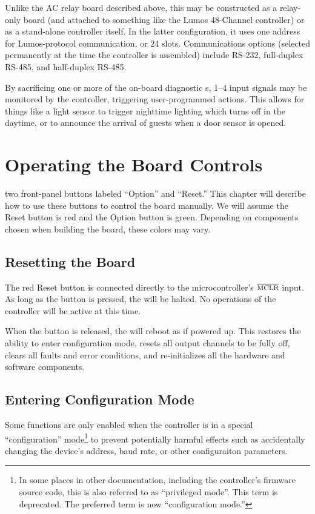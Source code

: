 \documentclass[letterpaper,twoside,onecolumn,openright,final]{memoir}
\begin{document}
Unlike the AC relay board described above, this may be constructed as a relay-only board (and attached
to something like the Lumos 48-Channel controller) or as a stand-alone controller itself.  In the latter
configuration, it uses one address for Lumos-protocol communication, or 24  slots.
Communications options (selected permanently at the time the controller is assembled) include
RS-232, full-duplex RS-485, and half-duplex RS-485.

By sacrificing one or more of the on-board diagnostic s, 1--4 input signals may be 
monitored by the controller, triggering user-programmed actions.  This allows for things like
a light sensor to trigger nighttime lighting which turns off in the daytime, or to announce the
arrival of guests when a door sensor is opened.


\chapter{Operating the Board Controls}
 two front-panel buttons labeled ``Option'' and ``Reset.''
This chapter will describe how to use these buttons to control the board manually.  We will assume the
Reset button is red and the Option button is green.  Depending on components chosen when building the
board, these colors may vary.

\section{Resetting the Board}
The red Reset button is connected directly to the microcontroller's $\overline{\hbox{\mc{MCLR}}}$ input.
As long as the button is pressed, the  will be halted.  No operations of the controller
will be active at this time.  

When the button is released, the  will reboot as if powered up.  This restores the ability
to enter configuration mode, resets all output channels to be fully off, 
clears all faults and error conditions, and re-initializes all the hardware
and software components.

\section{Entering Configuration Mode}\label{sec:configmode}
Some functions are only enabled when the controller is in a special ``configuration'' mode\footnote{In
some places in other documentation, including the controller's firmware source code, this is also
referred to as ``privileged mode''.  This term is deprecated. The preferred term is now
``configuration mode.''} to prevent potentially harmful effects such as accidentally changing
the device's address, baud rate, or other configuraiton parameters.
\end{document}
